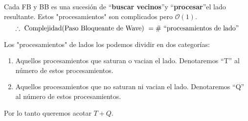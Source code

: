 \documentclass[12pt,a4paper]{report}
\begin{document}
			\par Cada FB y BB es una sucesión de \textquotedblleft \textbf{buscar vecinos}\textquotedblright y \textquotedblleft \textbf{procesar}\textquotedblright el lado resultante. Estos "procesamientos" \; son complicados pero $ \mathcal{O}(1)$.
			\[ \therefore \textup{ Complejidad(Paso Bloqueante de Wave) } = \# \textup{ \textquotedblleft procesamientos de lado\textquotedblright} \]

			\par Los "procesamientos" de lados los podemos dividir en dos categorías:
			\begin{enumerate}
				\item Aquellos procesamientos que saturan o vacian el lado. Denotaremos \textquotedblleft T\textquotedblright \; al número de estos procesamientos.
				\item Aquellos procesamientos que no saturan ni vacian el lado. Denotaremos \textquotedblleft Q\textquotedblright \; al número de estos procesamientos.
			\end{enumerate}
			\par Por lo tanto queremos acotar $T + Q$.
\end{document}
